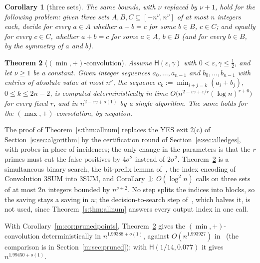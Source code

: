 \documentclass[11pt]{article}
\newtheorem{theorem}{Theorem}[section]
\newtheorem{corollary}[theorem]{Corollary}
\theoremstyle{definition}
\theoremstyle{remark}
\newcommand{\Hyp}{\mathsf{H}}
\newcommand{\ExpThreeSumVone}{1.99450}%
\newcommand{\MinConvShrTwentySix}{1.993927}%
\newcommand{\MinConvRBest}{1.99388}%
\begin{document}
\begin{corollary}[three sets]\label{s:cor:allnum3}
The same bounds, with $\nu$ replaced by $\nu+1$, hold for the following problem: given three sets $A,B,C\subseteq[-n^\nu,n^\nu]$ of at most $n$ integers each, decide for every $a\in A$ whether $a+b=c$ for some $b\in B$, $c\in C$; and equally for every $c\in C$, whether $a+b=c$ for some $a\in A$, $b\in B$ (and for every $b\in B$, by the symmetry of $a$ and $b$).
\end{corollary}

\begin{theorem}[$(\min,+)$-convolution]\label{s:thm:minconv}
Assume $\Hyp(\varepsilon,\gamma)$ with $0<\varepsilon,\gamma\le\frac12$, and let $\nu\ge1$ be a constant. Given integer sequences $a_0,\dots,a_{n-1}$ and $b_0,\dots,b_{n-1}$ with entries of absolute value at most $n^\nu$, the sequence $c_k:=\min_{i+j=k}(a_i+b_j)$, $0\le k\le2n-2$, is computed deterministically in time $O\big(n^{2-\varepsilon\gamma+\varepsilon/r}(\log n)^{r+6}\big)$ for every fixed $r$, and in $n^{2-\varepsilon\gamma+o(1)}$ by a single algorithm. The same holds for the $(\max,+)$-convolution, by negation.
\end{theorem}

The proof of Theorem~\ref{s:thm:allnum} replaces the YES exit 2(c) of Section~\ref{s:sec:algorithm} by the certification round of Section~\ref{e:sec:alledges}, with probes in place of incidences; the only change in the parameters is that the $r$ primes must cut the false positives by $4\sigma^2$ instead of $2\sigma^2$. Theorem~\ref{s:thm:minconv} is a simultaneous binary search, the bit-prefix lemma of~\cite[Lemma~26]{CMWW19}, the index encoding of Convolution 3SUM into 3SUM, and Corollary~\ref{s:cor:allnum3}: $O(\log^2n)$ calls on three sets of at most $2n$ integers bounded by $n^{\nu+2}$. No step splits the indices into blocks, so the saving stays a saving in $n$; the decision-to-search step of~\cite[Theorem~7]{CMWW19}, which halves it, is not used, since Theorem~\ref{s:thm:allnum} answers every output index in one call.

With Corollary~\ref{m:cor:prunedpoints}, Theorem~\ref{s:thm:minconv} gives the $(\min,+)$-convolution deterministically in $n^{\MinConvRBest+o(1)}$, against $O(n^{\MinConvShrTwentySix})$ in~\cite[Corollary~59]{Shr26} (the comparison is in Section~\ref{m:sec:pruned}); with $\Hyp(1/14,0.077)$ it gives $n^{\ExpThreeSumVone+o(1)}$.
\end{document}
